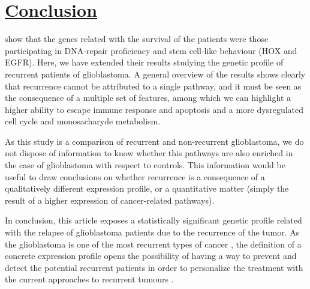 \documentclass[9pt,twocolumn,twoside]{gsajnl}
\begin{document}
\section*{\underline{Conclusion}}
\cite{Murat2008} show that the genes related with the survival of the patients were those participating in DNA-repair proficiency and stem cell-like behaviour (HOX and EGFR). Here, we have extended their results studying the genetic profile of recurrent patients of glioblastoma. A general overview of the results shows clearly that recurrence cannot be attributed to a single pathway, and it must be seen as the consequence of a multiple set of features, among which we can highlight a higher ability to escape immune response and apoptosis and a more dysregulated cell cycle and monosacharyde metabolism.

As this study is a comparison of recurrent and non-recurrent glioblastoma, we do not dispose of information to know whether this pathways are also enriched in the case of glioblastoma with respect to controls. This information would be useful to draw conclusions on whether recurrence is a consequence of a qualitatively different expression profile, or a quantitative matter (simply the result of a higher expression of cancer-related pathways).

In conclusion, this article exposes a statistically significant genetic profile related with the relapse of glioblastoma patients due to the recurrence of the tumor. As the glioblastoma is one of the most recurrent types of cancer \citep{Bleeker2012}, the definition of a concrete expression profile opens the possibility of having a way to prevent and detect the potential recurrent patients in order to personalize the treatment with the current approaches to recurrent tumours \citep{Weller2013}. 


\end{document}
